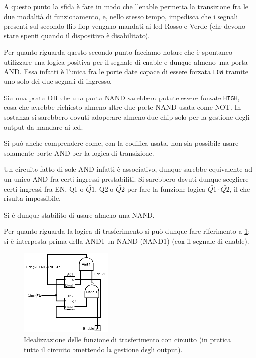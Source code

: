 \documentclass[a4paper,10pt]{article}
\def\code#1{\texttt{#1}}
\begin{document}
A questo punto la sfida è fare in modo che l'enable permetta la transizione fra le due modalità di funzionamento, e, nello stesso tempo, impedisca che i segnali presenti sul secondo flip-flop vengano mandati ai led Rosso e Verde (che devono stare spenti quando il dispositivo è disabilitato).
\newline

Per quanto riguarda questo secondo punto facciamo notare che è spontaneo utilizzare una logica positiva per il segnale di enable e dunque almeno una porta AND. Essa infatti è l'unica fra le porte date capace di essere forzata \code{LOW} tramite uno solo dei due segnali di ingresso. 

Sia una porta OR che una porta NAND sarebbero potute essere forzate \code{HIGH}, cosa che avrebbe richiesto almeno altre due porte NAND usata come NOT. In sostanza si sarebbero dovuti adoperare almeno due chip solo per la gestione degli output da mandare ai led.
\newline

Si può anche comprendere come, con la codifica usata, non sia possibile usare solamente porte AND per la logica di transizione.

Un circuito fatto di sole AND infatti è associativo, dunque sarebbe equivalente ad un unico AND fra certi ingressi prestabiliti. Si sarebbero dovuti dunque scegliere certi ingressi fra EN, Q1 o $\bar{Q1}$, Q2 o $\bar{Q2}$ per fare la funzione logica $\bar{Q1} \cdot \bar{Q2}$, il che risulta impossibile.

Si è dunque stabilito di usare almeno una NAND.
\newline

  
Per quanto riguarda la logica di trasferimento si può dunque fare riferimento a \cref{fig:solologica}: si è interposta prima della AND1 un NAND (NAND1) (con il segnale di enable). 


\begin{figure}[H]
	\centering
	\includegraphics[width=0.4\textwidth]{../grafici/solologica1.png}
	\caption{Idealizzazione delle funzione di trasferimento con circuito (in pratica tutto il circuito omettendo la gestione degli output).}
	\label{fig:solologica}
\end{figure}
\end{document}

